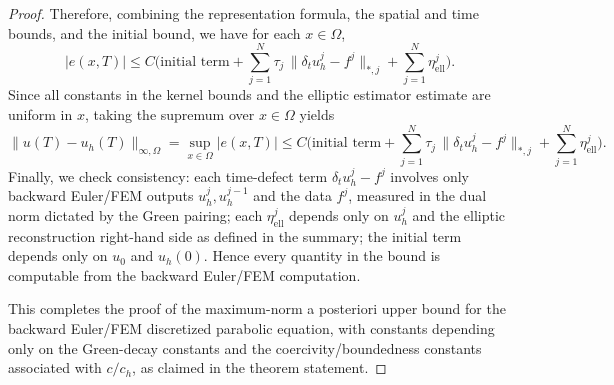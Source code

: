 \documentclass[11pt]{article}
\begin{document}
\begin{proof}
Therefore, combining the representation formula, the spatial and time bounds, and the initial bound, we have for each $x\in\Omega$,
\[
|e(x,T)|\le C\Big(\text{initial term} + \sum_{j=1}^N \tau_j\,\|\delta_t u_h^j-f^j\|_{\ast,j} + \sum_{j=1}^N \eta_\mathrm{ell}^j\Big).
\]
Since all constants in the kernel bounds and the elliptic estimator estimate are uniform in $x$, taking the supremum over $x\in\Omega$ yields
\[
\|u(T)-u_h(T)\|_{\infty,\Omega}=\sup_{x\in\Omega}|e(x,T)|\le C\Big(\text{initial term} + \sum_{j=1}^N \tau_j\,\|\delta_t u_h^j-f^j\|_{\ast,j} + \sum_{j=1}^N \eta_\mathrm{ell}^j\Big).
\]
Finally, we check consistency: each time-defect term $\delta_t u_h^j-f^j$ involves only backward Euler/FEM outputs $u_h^{j},u_h^{j-1}$ and the data $f^j$, measured in the dual norm dictated by the Green pairing; each $\eta_\mathrm{ell}^j$ depends only on $u_h^j$ and the elliptic reconstruction right-hand side as defined in the summary; the initial term depends only on $u_0$ and $u_h(0)$. Hence every quantity in the bound is computable from the backward Euler/FEM computation.

This completes the proof of the maximum-norm a posteriori upper bound for the backward Euler/FEM discretized parabolic equation, with constants depending only on the Green-decay constants and the coercivity/boundedness constants associated with $c/c_h$, as claimed in the theorem statement.
\end{proof}
\end{document}

